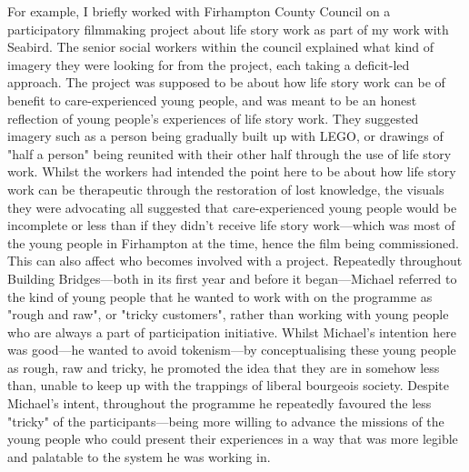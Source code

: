 For example, I briefly worked with Firhampton County Council on a participatory filmmaking project about life story work as part of my work with Seabird. The senior social workers within the council explained what kind of imagery they were looking for from the project, each taking a deficit-led approach. The project was supposed to be about how life story work can be of benefit to care-experienced young people, and was meant to be an honest reflection of young people's experiences of life story work. They suggested imagery  such as a person being gradually built up with LEGO, or drawings of "half a person" being reunited with their other half through the use of life story work. Whilst the workers had intended the point here to be about how life story work can be therapeutic through the restoration of lost knowledge, the visuals they were advocating all suggested that care-experienced young people would be incomplete or less than if they didn't receive life story work—which was most of the young people in Firhampton at the time, hence the film being commissioned. This can also affect who becomes involved with a project. Repeatedly throughout Building Bridges—both in its first year and before it began—Michael referred to the kind of young people that he wanted to work with on the programme as "rough and raw", or "tricky customers", rather than working with young people who are always a part of participation initiative. Whilst Michael's intention here was good—he wanted to avoid tokenism—by conceptualising these young people as rough, raw and tricky, he promoted the idea that they are in somehow less than, unable to keep up with the trappings of liberal bourgeois society. Despite Michael's intent, throughout the programme he repeatedly favoured the less "tricky" of the participants—being more willing to advance the missions of the young people who could present their experiences in a way that was more legible and palatable to the system he was working in.  

